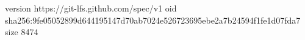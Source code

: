 version https://git-lfs.github.com/spec/v1
oid sha256:9fe05052899d644195147d70ab7024e526723695ebe2a7b24594f1fe1d07fda7
size 8474
